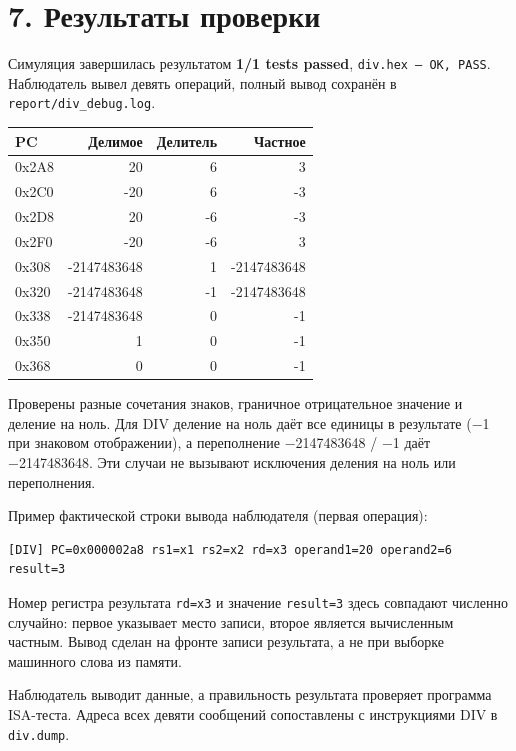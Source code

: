 \documentclass[
  russian,
]{article}
\newcounter{none} %
\begin{document}
\section{7. Результаты
проверки}\label{ux440ux435ux437ux443ux43bux44cux442ux430ux442ux44b-ux43fux440ux43eux432ux435ux440ux43aux438}

Симуляция завершилась результатом \textbf{1/1 tests passed},
\texttt{div.hex\ —\ OK,\ PASS}. Наблюдатель вывел девять операций,
полный вывод сохранён в \texttt{report/div\_debug.log}.

{\def\LTcaptype{none} %
\begin{longtable}[]{@{}lrrr@{}}
\toprule\noalign{}
PC & Делимое & Делитель & Частное \\
\midrule\noalign{}
\endhead
\bottomrule\noalign{}
\endlastfoot
0x2A8 & 20 & 6 & 3 \\
0x2C0 & -20 & 6 & -3 \\
0x2D8 & 20 & -6 & -3 \\
0x2F0 & -20 & -6 & 3 \\
0x308 & -2147483648 & 1 & -2147483648 \\
0x320 & -2147483648 & -1 & -2147483648 \\
0x338 & -2147483648 & 0 & -1 \\
0x350 & 1 & 0 & -1 \\
0x368 & 0 & 0 & -1 \\
\end{longtable}
}

Проверены разные сочетания знаков, граничное отрицательное значение и
деление на ноль. Для DIV деление на ноль даёт все единицы в результате
(−1 при знаковом отображении), а переполнение −2147483648 / −1 даёт
−2147483648. Эти случаи не вызывают исключения деления на ноль или
переполнения.


Пример фактической строки вывода наблюдателя (первая операция):

{\scriptsize
\begin{verbatim}
[DIV] PC=0x000002a8 rs1=x1 rs2=x2 rd=x3 operand1=20 operand2=6 result=3
\end{verbatim}
}

Номер регистра результата \texttt{rd=x3} и значение \texttt{result=3}
здесь совпадают численно случайно: первое указывает место записи,
второе является вычисленным частным. Вывод сделан на фронте записи
результата, а не при выборке машинного слова из памяти.

Наблюдатель выводит данные, а правильность результата проверяет
программа ISA-теста. Адреса всех девяти сообщений сопоставлены с
инструкциями DIV в \texttt{div.dump}.
\end{document}
